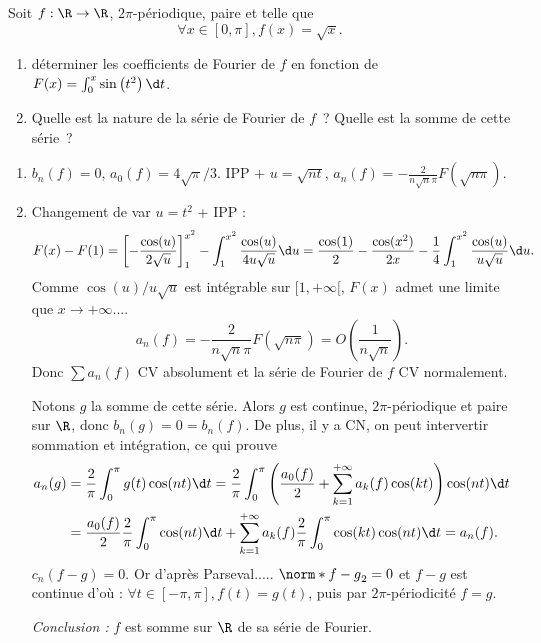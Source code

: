 \begin{enonce}
\begin{exercise}[ID={RMS 116 E808, Centrale MP 2005},subtitle={},tags={}, difficulty={0}]
Soit $f:\R\to\R$, $2\pi$-périodique, paire et telle que
\begin{equation*}
  \forall x\in[0,\pi], f(x)=\sqrt{x}.
\end{equation*}
\begin{enumerate}
  \item déterminer les coefficients de Fourier de $f$ en fonction de $F(x)=\int_0^x\sin\left( t^2 \right)\d t$.
  \item Quelle est la nature de la série de Fourier de $f$~?
    Quelle est la somme de cette série~?
\end{enumerate}
\end{exercise}
\begin{solution}
  \begin{enumerate}
    \item $b_n(f)=0$, $a_0(f)=4\sqrt\pi/3$.
      IPP + $u=\sqrt{nt}$, $a_n(f)=-\frac{2}{n\sqrt n\pi}F(\sqrt{n\pi})$.
    \item Changement de var $u=t^2$ + IPP :
      \begin{equation*}
        F(x)-F(1)
        =\left[-\frac{\cos(u)}{2\sqrt u}\right]_1^{x^2} - \int_1^{x^2}\frac{\cos(u)}{4u\sqrt u}\d u
        =\frac{\cos(1)}2-\frac{\cos(x^2)}{2x}-\frac14\int_1^{x^2}\frac{\cos(u)}{u\sqrt u}\d u.
      \end{equation*}
      Comme $\cos(u)/u\sqrt u$ est intégrable sur $[1,+\infty[$, $F(x)$ admet une limite que $x\to+\infty$....
      \begin{equation*}
        a_n(f)=-\frac2{n\sqrt n\pi}F\left( \sqrt{n\pi} \right) = O\left( \frac{1}{n\sqrt n} \right).
      \end{equation*}
      Donc $\sum a_n(f)$ CV absolument et la série de Fourier de $f$ CV normalement.

      Notons $g$ la somme de cette série.
      Alors $g$ est continue, $2\pi$-périodique et paire sur $\R$, donc
      $b_n(g)=0=b_n(f)$.
      De plus, il y  a CN, on peut intervertir sommation et intégration, ce qui prouve
      \begin{align*}
      a_n(g)
      &= \frac2\pi\int_0^\pi g(t)\cos(nt)\d t
      =\frac2\pi\int_0^\pi\left( \frac{a_0(f)}2 + \sum_{k=1}^{+\infty}a_k(f)\cos(kt) \right)\cos(nt)\d t\\
      &= \frac{a_0(f)}2\frac2\pi\int_0^\pi\cos(nt)\d t + \sum_{k=1}^{+\infty} a_k(f)\frac2\pi\int_0^\pi\cos(kt)\cos(nt)\d t = a_n(f).
      \end{align*}
      $c_n(f-g)=0$. Or d'après Parseval..... $\norm*{f-g}_2=0$ et $f-g$ est continue d'où : $\forall t\in[-\pi,\pi], f(t)=g(t)$, puis par $2\pi$-périodicité $f=g$.

      \noindent\emph{Conclusion : } $f$ est somme sur $\R$ de sa série de Fourier.
  \end{enumerate}
\end{solution}
\end{enonce}
